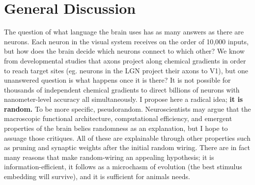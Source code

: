 \chapter{\color{thesisBlue} General Discussion} %

\label{ch:generalDiscussion} %
\glsresetall



The question of what language the brain uses has as many answers as there are neurons. Each neuron in the visual system receives on the order of 10,000 inputs, but how does the brain decide which neurons connect to which other? We know from developmental studies that axons project along chemical gradients in order to reach target sites (eg. neurons in the LGN project their axons to V1), but one unanswered question is what happens once it is there? It is not possible for thousands of independent chemical gradients to direct billions of neurons with nanometer-level accuracy all simultaneously. I propose here a radical idea; \textbf{it is random.} To be more specific, pseudorandom. Neuroscientists may argue that the macroscopic functional architecture, computational efficiency, and emergent properties of the brain belies randomness as an explanation, but I hope to assuage those critiques. All of these are explainable through other properties such as pruning and synaptic weights after the initial random wiring. There are in fact many reasons that make random-wiring an appealing hypothesis; it is information-efficient, it follows as a microchasm of evolution (the best stimulus embedding will survive), and it is sufficient for animals needs. 

